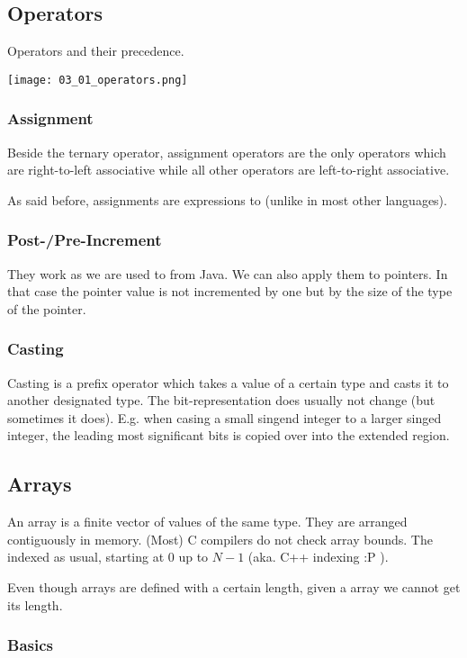 

\subsection*{Operators}
Operators and their precedence.

\texttt{[image: 03\_01\_operators.png]}

\subsubsection{Assignment}
Beside the ternary operator, assignment operators are the only operators which are right-to-left associative while all other operators are left-to-right associative.

As said before, assignments are expressions to (unlike in most other languages).

\subsubsection{Post-/Pre-Increment}
They work as we are used to from Java. We can also apply them to pointers. In that case the pointer value is not incremented by one but by the size of the type of the pointer.

\subsubsection{Casting}
Casting is a prefix operator  which takes a value of a certain type and casts it to another designated type. The bit-representation does usually not change (but sometimes it does). E.g. when casing a small singend integer to a larger singed integer, the leading most significant bits is copied over into the extended region.

\subsection*{Arrays}
An array is a finite vector of values of the same type. They are arranged contiguously in memory. (Most) C compilers do not check array bounds. The indexed as usual, starting at $0$ up to $N-1$ (aka. C++ indexing :P ).

Even though arrays are defined with a certain length, given a array we cannot get its length.

\subsubsection{Basics}

